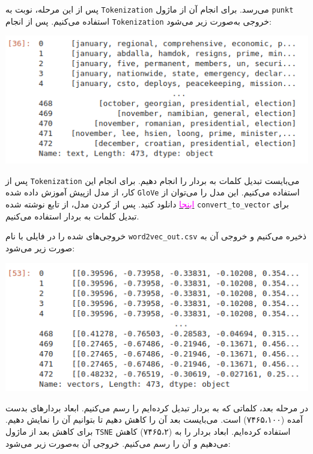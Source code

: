 \begin{enumerate}
\begin{qsolve}
		پس از این مرحله، نوبت به \texttt{Tokenization} می‌رسد. برای انجام آن از ماژول \texttt{punkt} استفاده می‌کنیم. پس از انجام \texttt{Tokenization} خروجی به‌صورت زیر می‌شود:
		
		\begin{center}
			\includegraphics*[width=0.8\linewidth]{pics/img13.png}
			\label{خروجی عملیات Tokenization}
		\end{center}
	
	
	پس از \texttt{Tokenization} می‌بایست تبدیل کلمات به بردار را انجام دهیم. برای انجام این کار، از مدل از‌پیش آموزش داده شده \texttt{GloVe} استفاده می‌کنیم. این مدل را می‌توان از \href{https://github.com/allenai/spv2/tree/master/model}{\textcolor{magenta}{اینجا}} دانلود کنید. پس از  کردن مدل، از تابع نوشته شده \texttt{convert\_to\_vector} برای تبدیل کلمات به بردار استفاده می‌کنیم.
	\end{qsolve}
	
	
	
	
	
	
	
	
	\begin{qsolve}
		خروجی‌های  شده را در فایلی با نام \texttt{word2vec\_out.csv} ذخیره می‌کنیم و خروجی آن به صورت زیر می‌شود:
		
		
		\begin{center}
			\includegraphics*[width=0.8\linewidth]{pics/img14.png}
			\label{کلمات تبدیل شده به بردار}
		\end{center}
		
در مرحله بعد، کلماتی که به بردار تبدیل کرده‌ایم را رسم می‌کنیم. ابعاد بردار‌های بدست آمده (۷۴۶۵،۱۰۰) است. می‌بایست بعد آن را کاهش دهیم تا بتوانیم آن را نمایش دهیم. برای کاهش بعد از ماژول \texttt{TSNE} استفاده کرده‌ایم. ابعاد بردار را به (۷۴۶۵،۲) کاهش می‌دهیم و آن را رسم می‌کنیم. خروجی آن به‌صورت زیر می‌شود:



\end{qsolve}
\end{enumerate}
